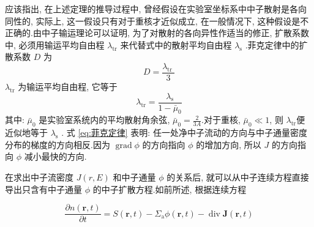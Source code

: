 \documentclass{Sichuan Normal University}
\begin{document}
应该指出, 在上述定理的推导过程中, 曾经假设在实验室坐标系中中子散射是各向同性的, 实际上, 这一假设只有对于重核才近似成立, 在一般情况下, 这种假设是不正确的.由中子输运理论可以证明, 为了对散射的各向异性作适当的修正, 扩散系数中, 必须用输运平均自由程 $\lambda_{\mathrm{tr}}$ 来代替式中的散射平均自由程 $\lambda_{\mathrm{s}}$ .菲克定律中的扩散系数 $D$ 为
\begin{equation}
    D=\frac{\lambda_{\text {tr }}}{3}
    \label{eq:扩散系数}
\end{equation}
    $\lambda_{\mathrm{tr}}$ 为输运平均自由程, 它等于
\begin{equation}
    \lambda_{\mathrm{tr}}=\frac{\lambda_{\mathrm{s}}}{1-\bar{\mu}_0}
    \label{eq:输运平均自由程}
\end{equation}其中: $\bar{\mu}_0$ 是实验室系统内的平均散射角余弦\cite{XieZhongShengHeFanYingDuiWuLiFenXi2020}, $\bar{\mu}_0=\frac{2}{3 A}$.对于重核, $\bar{\mu}_0 \ll 1$, 则 $\lambda_{\mathrm{tr}}$便近似地等于 $\lambda_{\mathrm{s}}$ .
式 \eqref{eq:菲克定律} 表明: 任一处净中子流动的方向与中子通量密度分布的梯度的方向相反.因为 $\operatorname{grad} \phi$ 的方向指向 $\phi$ 的增加方向, 所以 $J$ 的方向指向 $\phi$ 减小最快的方向.


在求出中子流密度 $J(r, E)$ 和中子通量 $\phi$ 的关系后, 就可以从中子连续方程直接导出只含有中子通量 $\phi$ 的中子扩散方程.如前所述, 根据连续方程

\begin{equation}
    \frac{\partial n(\boldsymbol{r}, t)}{\partial t}=S(\boldsymbol{r}, t)-\Sigma_{\mathrm{a}} \phi(\boldsymbol{r}, t)-\operatorname{div} \boldsymbol{J}(\boldsymbol{r}, t)
\end{equation}
\end{document}
